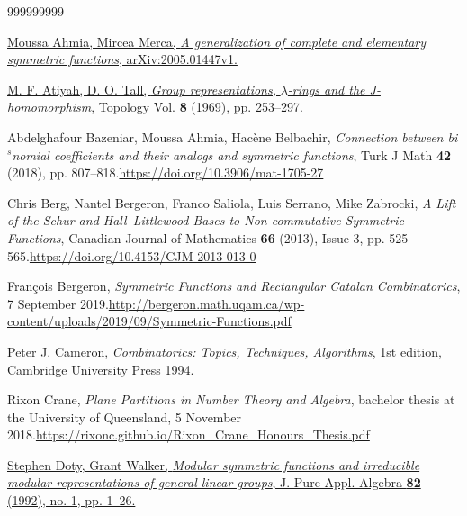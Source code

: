 \documentclass[numbers=enddot,12pt,final,onecolumn,notitlepage]{scrartcl}%
\theoremstyle{definition}
\begin{document}
\begin{thebibliography}{999999999}                                                                                        %


\href{https://arxiv.org/abs/2005.01447v1}{Moussa
Ahmia, Mircea Merca, \textit{A generalization of complete and elementary
symmetric functions}, arXiv:2005.01447v1.}

%
\href{https://doi.org/10.1016/0040-9383(69)90015-9}{M. F. Atiyah, D. O. Tall,
\textit{Group representations, }$\lambda$\textit{-rings and the
J-homomorphism}, Topology Vol. \textbf{8} (1969), pp. 253--297}.

Abdelghafour Bazeniar, Moussa Ahmia, Hac\`{e}ne
Belbachir, \textit{Connection between bi}$^{s}$\textit{nomial coefficients and
their analogs and symmetric functions}, Turk J Math \textbf{42} (2018), pp.
807--818.\newline\url{https://doi.org/10.3906/mat-1705-27}

Chris Berg, Nantel Bergeron, Franco Saliola, Luis
Serrano, Mike Zabrocki, \textit{A Lift of the Schur and Hall--Littlewood Bases
to Non-commutative Symmetric Functions}, Canadian Journal of Mathematics
\textbf{66} (2013), Issue 3, pp. 525--565.\newline\url{https://doi.org/10.4153/CJM-2013-013-0}

Fran\c{c}ois Bergeron, \textit{Symmetric Functions
and Rectangular Catalan Combinatorics}, 7 September 2019.\newline\url{http://bergeron.math.uqam.ca/wp-content/uploads/2019/09/Symmetric-Functions.pdf}

Peter J. Cameron, \textit{Combinatorics: Topics,
Techniques, Algorithms}, 1st edition, Cambridge University Press 1994.

Rixon Crane, \textit{Plane Partitions in Number
Theory and Algebra}, bachelor thesis at the University of Queensland, 5
November 2018.\newline\url{https://rixonc.github.io/Rixon_Crane_Honours_Thesis.pdf}

%
\href{https://doi.org/10.1016/0022-4049(92)90007-3}{Stephen Doty, Grant
Walker, \textit{Modular symmetric functions and irreducible modular
representations of general linear groups}, J. Pure Appl. Algebra \textbf{82}
(1992), no. 1, pp. 1--26.}


\end{thebibliography}
\end{document}
